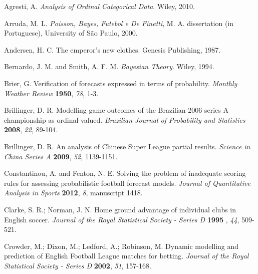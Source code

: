 \documentclass[journal,article,accept,moreauthors,pdftex,12pt,a4paper]{mdpi}
\begin{document}
		\begin{thebibliography}{999} %
			
			
			
			Agresti, A. {\em Analysis of Ordinal Categorical Data}. Wiley, 2010. 
			
			Arruda, M. L. {\em Poisson, Bayes, Futebol e De Finetti}, M. A. dissertation (in Portuguese), University of S\~ao Paulo, 2000.
			
			Andersen, H.  C. The emperor's new clothes. Genesis Publishing, 1987.

			Bernardo, J. M. and Smith, A. F. M. {\em Bayesian Theory}. Wiley, 1994.
			
			Brier, G. Verification of forecasts expressed in terms of probability. {\em Monthly Weather Review} {\bf 1950}, {\em 78}, 1-3.
			
			Brillinger, D. R. Modelling game outcomes of the Brazilian 2006
			series A championship as ordinal-valued. {\em Brazilian Journal of Probability and Statistics} {\bf 2008}, {\em 22}, 89-104.
			
			Brillinger, D. R. An analysis of Chinese Super League partial
			results. {\em Science in China Series A} {\bf 2009}, {\em 52},
			1139-1151.
			
			Constantinou, A. and Fenton, N. E. Solving the problem of inadequate scoring rules for assessing probabilistic football forecast models. {\em Journal of Quantitative Analysis in Sports} {\bf 2012}, {\em 8}, manuscript 1418.
			
			Clarke, S. R.; Norman, J. N. Home ground advantage of individual clubs in English soccer. {\em Journal of the Royal Statistical Society - Series D} {\bf 1995} ,
			{\em 44}, 509-521.
			
			 Crowder, M.; Dixon, M.; Ledford, A.; Robinson, M. Dynamic modelling and prediction of English
			Football League matches for betting. {\em Journal of the Royal
				Statistical Society - Series D} {\bf 2002}, {\em 51}, 157-168.
			

\end{thebibliography}
\end{document}
